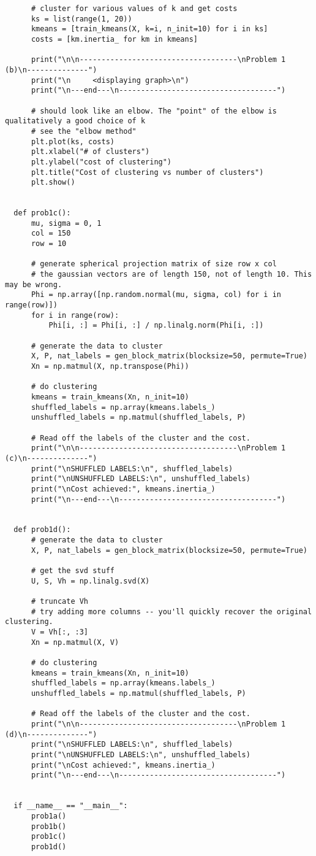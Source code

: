 \begin{verbatim}
      # cluster for various values of k and get costs
      ks = list(range(1, 20))
      kmeans = [train_kmeans(X, k=i, n_init=10) for i in ks]
      costs = [km.inertia_ for km in kmeans]

      print("\n\n------------------------------------\nProblem 1 (b)\n--------------")
      print("\n     <displaying graph>\n")
      print("\n---end---\n------------------------------------")

      # should look like an elbow. The "point" of the elbow is qualitatively a good choice of k
      # see the "elbow method"
      plt.plot(ks, costs)
      plt.xlabel("# of clusters")
      plt.ylabel("cost of clustering")
      plt.title("Cost of clustering vs number of clusters")
      plt.show()


  def prob1c():
      mu, sigma = 0, 1
      col = 150
      row = 10

      # generate spherical projection matrix of size row x col
      # the gaussian vectors are of length 150, not of length 10. This may be wrong.
      Phi = np.array([np.random.normal(mu, sigma, col) for i in range(row)])
      for i in range(row):
          Phi[i, :] = Phi[i, :] / np.linalg.norm(Phi[i, :])

      # generate the data to cluster
      X, P, nat_labels = gen_block_matrix(blocksize=50, permute=True)
      Xn = np.matmul(X, np.transpose(Phi))

      # do clustering
      kmeans = train_kmeans(Xn, n_init=10)
      shuffled_labels = np.array(kmeans.labels_)
      unshuffled_labels = np.matmul(shuffled_labels, P)

      # Read off the labels of the cluster and the cost.
      print("\n\n------------------------------------\nProblem 1 (c)\n--------------")
      print("\nSHUFFLED LABELS:\n", shuffled_labels)
      print("\nUNSHUFFLED LABELS:\n", unshuffled_labels)
      print("\nCost achieved:", kmeans.inertia_)
      print("\n---end---\n------------------------------------")


  def prob1d():
      # generate the data to cluster
      X, P, nat_labels = gen_block_matrix(blocksize=50, permute=True)

      # get the svd stuff
      U, S, Vh = np.linalg.svd(X)

      # truncate Vh
      # try adding more columns -- you'll quickly recover the original clustering.
      V = Vh[:, :3]
      Xn = np.matmul(X, V)

      # do clustering
      kmeans = train_kmeans(Xn, n_init=10)
      shuffled_labels = np.array(kmeans.labels_)
      unshuffled_labels = np.matmul(shuffled_labels, P)

      # Read off the labels of the cluster and the cost.
      print("\n\n------------------------------------\nProblem 1 (d)\n--------------")
      print("\nSHUFFLED LABELS:\n", shuffled_labels)
      print("\nUNSHUFFLED LABELS:\n", unshuffled_labels)
      print("\nCost achieved:", kmeans.inertia_)
      print("\n---end---\n------------------------------------")


  if __name__ == "__main__":
      prob1a()
      prob1b()
      prob1c()
      prob1d()
\end{verbatim}

